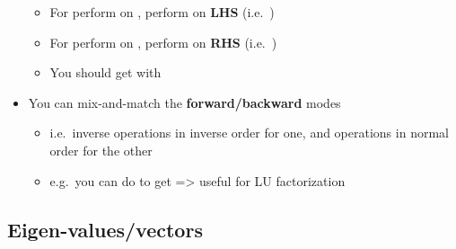 \begin{itemize}
  \begin{itemize}
  
  \item
    For  perform  on
    , perform  on \textbf{LHS}
    (i.e.~)
  \item
    For  perform  on ,
    perform  on \textbf{RHS}
    (i.e.~)
  \item
    You should get
    \iMbox{\ds [I_{m} \ | \ A \ | \ I_{n}] \rightsquigarrow [R^{-1} \ | \ A' \ | \ C^{-1}]}
    with 
  \end{itemize}
\item
  You can mix-and-match the \textbf{forward/backward} modes

  \begin{itemize}
  
  \item
    i.e.~inverse operations in inverse order for one, and operations in
    normal order for the other
  \item
    e.g.~you can do
    \iMbox{\ds [I_{m} \ | \ A \ | \ I_{n}] \rightsquigarrow [R^{-1} \ | \ A' \ | \ C]}
    to get  =\textgreater{} useful for LU
    factorization
  \end{itemize}
\end{itemize}

\subsection*{Eigen-values/vectors}

